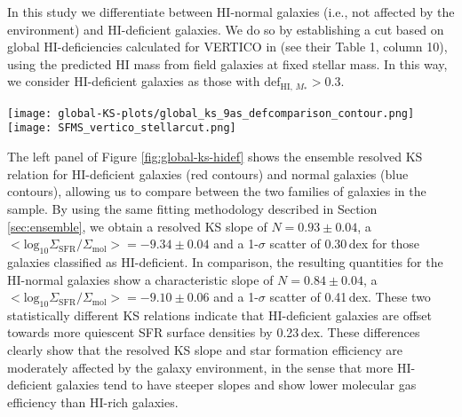 \documentclass[longauth]{aa}
\begin{document}
In this study we differentiate between HI-normal galaxies (i.e., not affected by the environment) and HI-deficient galaxies. We do so by establishing a cut based on global HI-deficiencies calculated for VERTICO in \citet{Zabel2022} (see their Table 1, column 10), using the predicted HI mass from field galaxies at fixed stellar mass. In this way, we consider HI-deficient galaxies as those with $\mathrm{def}_{\mathrm{HI},\,M_*}>0.3$.

\begin{figure*}
\centering
\texttt{[image: global-KS-plots/global\_ks\_9as\_defcomparison\_contour.png]}\,
\texttt{[image: SFMS\_vertico\_stellarcut.png]}
\caption{Left: resolved KS relation for the VERTICO ensemble sample at a resolution of 720\,pc. The red contours show the relation obtained for HI-deficient galaxies, according to \citet{Zabel2022}, whereas the blue contours indicate the relation obtained for normal galaxies. Solid lines indicate LTS fits to the data. Similarly to Figure \ref{fig:global-ks-inc} only galaxies with $i < 80^o$ have been considered and values for $\Sigma_{\mathrm{SFR}}$ and $\Sigma_{\mathrm{mol}}$ have been corrected to face-on via $\mathrm{cos} i$. The plot shows longer gas depletion times for HI-deficient VERTICO galaxies. Right: $\textrm{SFR}-M_\star$ relation for the VERTICO subsample, limited to HI-deficient and HI-normal galaxies covering the same range in stellar mass. The different colors indicate HI-deficient (red) and HI-normal (blue) galaxies. Overlaid are the star formation main sequence (SFMS) relation obtained in \citet{Elbaz2007} in black (solid line), as well as that presented in xCOLD GASS in orange \citep{Saintonge2016}. While VERTICO HI-normal galaxies lie on the SFMS, HI-deficient galaxies are mostly scattered below the SFMS.}

\label{fig:global-ks-hidef}
\end{figure*}

The left panel of Figure \ref{fig:global-ks-hidef} shows the ensemble resolved KS relation for HI-deficient galaxies (red contours) and normal galaxies (blue contours), allowing us to compare between the two families of galaxies in the sample. By using the same fitting methodology described in Section \ref{sec:ensemble}, we obtain a resolved KS slope of $N=0.93\pm0.04$, a $< \mathrm{log}_{10} \Sigma_\mathrm{SFR}/\Sigma_\mathrm{mol} > =-9.34\pm0.04$ and a 1-$\sigma$ scatter of 0.30\,dex for those galaxies classified as HI-deficient. In comparison, the resulting quantities for the HI-normal galaxies show a characteristic slope of $N=0.84\pm0.04$, a $< \mathrm{log}_{10} \Sigma_\mathrm{SFR}/\Sigma_\mathrm{mol} > =-9.10\pm0.06$ and a 1-$\sigma$ scatter of 0.41\,dex. These two statistically different KS relations indicate that HI-deficient galaxies are offset towards more quiescent SFR surface densities by 0.23\,dex. These differences clearly show that the resolved KS slope and star formation efficiency are moderately affected by the galaxy environment, in the sense that more HI-deficient galaxies tend to have steeper slopes and show lower molecular gas efficiency than HI-rich galaxies.
\end{document}
